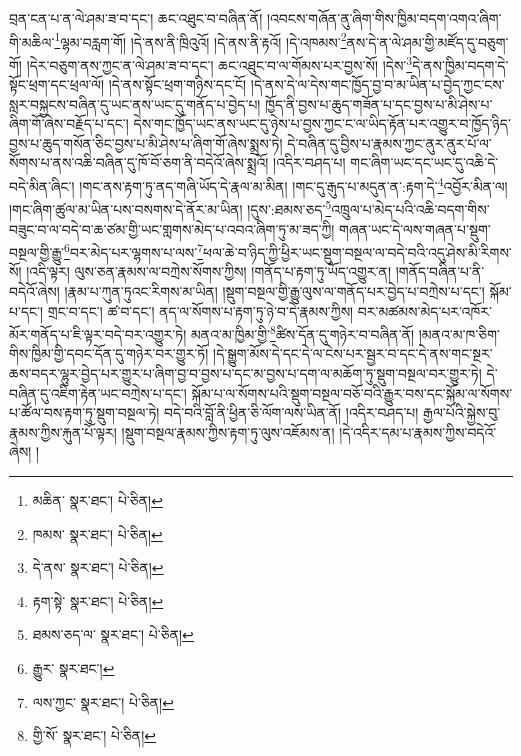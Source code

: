 བྲན་ངན་པ་ན་ལེ་ཤམ་ཟ་བ་དང་། ཆང་འཐུང་བ་བཞིན་ནོ། །འབངས་གཞོན་ནུ་ཞིག་གིས་ཁྱིམ་བདག་འགའ་ཞིག་གི་མཆིལ་\footnote{མཆིན་  སྣར་ཐང་།  པེ་ཅིན། }ལྷམ་བརླག་གོ། །དེ་ནས་ནི་ཁྲིའུའོ། །དེ་ནས་ནི་རྟའོ། །དེ་འཁམས་\footnote{ཁམས་  སྣར་ཐང་།  པེ་ཅིན། }ནས་དེ་ན་ལེ་ཤམ་གྱི་མཛོད་དུ་བཅུག་གོ། །དེར་བཅུག་ནས་ཀྱང་ན་ལེ་ཤམ་ཟ་བ་དང་། ཆང་འཐུང་བ་ལ་གོམས་པར་བྱས་སོ། །དེས་\footnote{དེ་ནས་  སྣར་ཐང་།  པེ་ཅིན། }དེ་ནས་ཁྱིམ་བདག་དེ་སྟོང་ཕྲག་དང་ཕྲལ་ལོ། །དེ་ནས་སྟོང་ཕྲག་གཉིས་དང་ངོ། །དེ་ནས་དེ་ལ་དེས་གང་ཁྱོད་བྱ་བ་མ་ཡིན་པ་བྱེད་ཀྱང་ངས་སླར་བསྐྱངས་བཞིན་དུ་ཡང་ནས་ཡང་དུ་གནོད་པ་བྱེད་པ། ཁྱོད་ནི་བྱས་པ་ཆུད་གཟོན་པ་དང་བྱས་པ་མི་ཤེས་པ་ཞིག་གོ་ཞེས་བརྗོད་པ་དང་། དེས་གང་ཁྱོད་ཡང་ནས་ཡང་དུ་ཉེས་པ་བྱས་ཀྱང་ང་ལ་ཡིད་རྟོན་པར་འགྱུར་བ་ཁྱོད་ཉིད་བྱས་པ་ཆུད་གསོན་ཅིང་བྱས་པ་མི་ཤེས་པ་ཞིག་གོ་ཞེས་སྨྲས་ཏེ། དེ་བཞིན་དུ་བྱིས་པ་རྣམས་ཀྱང་ནུར་ནུར་པོ་ལ་སོགས་པ་ནས་འཆི་བཞིན་དུ་ཁོ་བོ་ཅག་ནི་བདེའོ་ཞེས་སྨྲའོ། །འདིར་བཤད་པ། གང་ཞིག་ཡང་དང་ཡང་དུ་འཆི་དེ་བདེ་མིན་ཞིང་། །གང་ནས་རྟག་ཏུ་ནད་གཞི་ཡོད་དེ་རྣལ་མ་མིན། །གང་དུ་རྒུད་པ་མདུན་ན་:རྟག་དེ་\footnote{རྟག་སྟེ་  སྣར་ཐང་།  པེ་ཅིན། }འབྱོར་མིན་ལ། །གང་ཞིག་ཚུལ་མ་ཡིན་པས་བསགས་དེ་ནོར་མ་ཡིན། །དུས་:ཐམས་ཅད་\footnote{ཐམས་ཅད་ལ་  སྣར་ཐང་།  པེ་ཅིན། }འཁྲུལ་པ་མེད་པའི་འཆི་བདག་གིས་བཟུང་བ་ལ་བདེ་བ་ཆ་ཙམ་གྱི་ཡང་གླགས་མེད་པ་འབའ་ཞིག་ཏུ་མ་ཟད་ཀྱི། གཞན་ཡང་དེ་ལས་གཞན་པ་སྡུག་བསྔལ་གྱི་རྒྱུ་\footnote{རྒྱུར་  སྣར་ཐང་། }བར་མེད་པར་ལྷགས་པ་ལས་\footnote{ལས་ཀྱང་  སྣར་ཐང་།  པེ་ཅིན། }ཕལ་ཆེ་བ་ཉིད་ཀྱི་ཕྱིར་ཡང་སྡུག་བསྔལ་ལ་བདེ་བའི་འདུ་ཤེས་མི་རིགས་སོ། །འདི་ལྟར། ལུས་ཅན་རྣམས་ལ་བཀྲེས་སོགས་ཀྱིས། །གནོད་པ་རྟག་ཏུ་ཡོད་འགྱུར་ན། །གནོད་བཞིན་པ་ནི་བདེའོ་ཞེས། །རྣམ་པ་ཀུན་ཏུའང་རིགས་མ་ཡིན། །སྡུག་བསྔལ་གྱི་རྒྱུ་ལུས་ལ་གནོད་པར་བྱེད་པ་བཀྲེས་པ་དང་། སྐོམ་པ་དང་། གྲང་བ་དང་། ཚ་བ་དང་། ནད་ལ་སོགས་པ་རྟག་ཏུ་ཉེ་བ་དེ་རྣམས་ཀྱིས། བར་མཚམས་མེད་པར་འཁོར་མོར་གནོད་པ་ཇི་ལྟར་བདེ་བར་འགྱུར་ཏེ། མནའ་མ་ཁྱིམ་གྱི་\footnote{གྱི་སོ་  སྣར་ཐང་།  པེ་ཅིན། }ཚིས་དོན་དུ་གཉེར་བ་བཞིན་ནོ། །མནའ་མ་ཁ་ཅིག་གིས་ཁྱིམ་གྱི་དབང་དོན་དུ་གཉེར་བར་གྱུར་ཏོ། །དེ་སྒྱུག་མོས་དེ་དང་དེ་ལ་ངེས་པར་སྦྱར་བ་དང་དེ་ནས་གང་སྔར་ཆས་བདར་ལྷུར་བྱེད་པར་གྱུར་པ་ཞིག་བྱ་བ་བྱས་པ་དང་མ་བྱས་པ་དག་ལ་མཆོག་ཏུ་སྡུག་བསྔལ་བར་གྱུར་ཏེ། དེ་བཞིན་དུ་འཇིག་རྟེན་ཡང་བཀྲེས་པ་དང་། སྐོམ་པ་ལ་སོགས་པའི་སྡུག་བསྔལ་བཅོ་བའི་རྒྱུར་བས་དང་སྐོམ་ལ་སོགས་པ་ཚོལ་བས་རྟག་ཏུ་སྡུག་བསྔལ་ཏེ། བདེ་བའི་བློ་ནི་ཕྱིན་ཅི་ལོག་ལས་ཡིན་ནོ། །འདིར་བཤད་པ། རྒྱལ་པོའི་སྐྱེས་བུ་རྣམས་ཀྱིས་རྐུན་པོ་ལྟར། །སྡུག་བསྔལ་རྣམས་ཀྱིས་རྟག་ཏུ་ལུས་འཇོམས་ན། །དེ་འདིར་དམ་པ་རྣམས་ཀྱིས་བདེའོ་ཞེས། །
